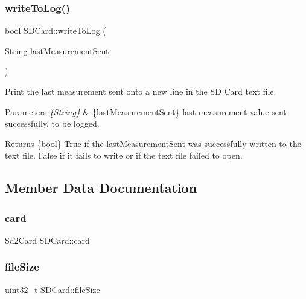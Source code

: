\subsubsection{\texorpdfstring{write\+To\+Log()}{writeToLog()}}
{\footnotesize\ttfamily bool S\+D\+Card\+::write\+To\+Log (\begin{DoxyParamCaption}\item[{String}]{last\+Measurement\+Sent }\end{DoxyParamCaption})}

Print the last measurement sent onto a new line in the SD Card text file. 
\begin{DoxyParams}{Parameters}
{\em \{\+String\}} & \{last\+Measurement\+Sent\} last measurement value sent successfully, to be logged. \\
\hline
\end{DoxyParams}
\begin{DoxyReturn}{Returns}
\{bool\} True if the last\+Measurement\+Sent was successfully written to the text file. False if it fails to write or if the text file failed to open. 
\end{DoxyReturn}


\subsection{Member Data Documentation}
\mbox{\label{class_s_d_card_a20919e15549972b09ad3c063c35fcf59}} 
\subsubsection{\texorpdfstring{card}{card}}
{\footnotesize\ttfamily Sd2\+Card S\+D\+Card\+::card}

\mbox{\label{class_s_d_card_a9f97edfb78131f459dbbda495903663e}} 
\subsubsection{\texorpdfstring{file\+Size}{fileSize}}
{\footnotesize\ttfamily uint32\+\_\+t S\+D\+Card\+::file\+Size}

\mbox{\label{class_s_d_card_a2e9756d5c5478bee2d7977a0c66ec47f}} 
